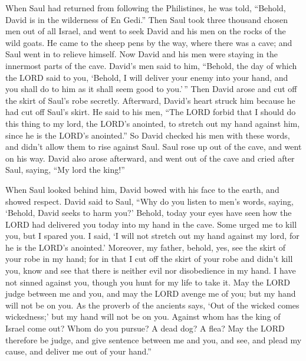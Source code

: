  When Saul had returned from following the Philistines, he
was told, ``Behold, David is in the wilderness of En Gedi.''
 Then Saul took three thousand chosen men out of all Israel,
and went to seek David and his men on the rocks of the wild goats.
 He came to the sheep pens by the way, where there was a
cave; and Saul went in to relieve himself. Now David and his men were
staying in the innermost parts of the cave.  David's men
said to him, ``Behold, the day of which the LORD said to you, `Behold, I
will deliver your enemy into your hand, and you shall do to him as it
shall seem good to you.'\,'' Then David arose and cut off the skirt of
Saul's robe secretly.  Afterward, David's heart struck him
because he had cut off Saul's skirt.  He said to his men,
``The LORD forbid that I should do this thing to my lord, the LORD's
anointed, to stretch out my hand against him, since he is the LORD's
anointed.''  So David checked his men with these words, and
didn't allow them to rise against Saul. Saul rose up out of the cave,
and went on his way.  David also arose afterward, and went
out of the cave and cried after Saul, saying, ``My lord the king!''

When Saul looked behind him, David bowed with his face to the earth, and
showed respect.  David said to Saul, ``Why do you listen to
men's words, saying, `Behold, David seeks to harm you?' 
Behold, today your eyes have seen how the LORD had delivered you today
into my hand in the cave. Some urged me to kill you, but I spared you. I
said, `I will not stretch out my hand against my lord, for he is the
LORD's anointed.'  Moreover, my father, behold, yes, see
the skirt of your robe in my hand; for in that I cut off the skirt of
your robe and didn't kill you, know and see that there is neither evil
nor disobedience in my hand. I have not sinned against you, though you
hunt for my life to take it.  May the LORD judge between me
and you, and may the LORD avenge me of you; but my hand will not be on
you.  As the proverb of the ancients says, `Out of the
wicked comes wickedness;' but my hand will not be on you. 
Against whom has the king of Israel come out? Whom do you pursue? A dead
dog? A flea?  May the LORD therefore be judge, and give
sentence between me and you, and see, and plead my cause, and deliver me
out of your hand.''

